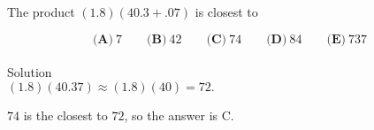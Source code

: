 

The product $ (1.8)(40.3+.07)$ is closest to

\[ \textbf{(A)}\ 7 \qquad
\textbf{(B)}\ 42 \qquad
\textbf{(C)}\ 74 \qquad
\textbf{(D)}\ 84 \qquad
\textbf{(E)}\ 737
\]
\\
Solution
\\
$(1.8)(40.37)\approx (1.8)(40)=72.$

$74$ is the closest to $72$, so the answer is $\boxed{\text{C}}$.